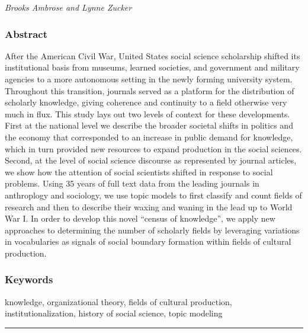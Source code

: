 \documentclass[]{book}
\theoremstyle{definition}
\theoremstyle{definition}
\theoremstyle{definition}
\theoremstyle{remark}
\begin{document}
\emph{Brooks Ambrose and Lynne Zucker}

\hypertarget{abstract-3}{%
\subsubsection*{Abstract}\label{abstract-3}}


After the American Civil War, United States social science
scholarship shifted its institutional basis from museums, learned
societies, and government and military agencies to a more autonomous
setting in the newly forming university system. Throughout this
transition, journals served as a platform for the distribution of
scholarly knowledge, giving coherence and continuity to a field
otherwise very much in flux. This study lays out two levels of context
for these developments. First at the national level we describe the
broader societal shifts in politics and the economy that corresponded to
an increase in public demand for knowledge, which in turn provided new
resources to expand production in the social sciences. Second, at the
level of social science discourse as represented by journal articles, we
show how the attention of social scientists shifted in response to
social problems. Using 35 years of full text data from the leading
journals in anthroplogy and sociology, we use topic models to first
classify and count fields of research and then to describe their waxing
and waning in the lead up to World War I. In order to develop this novel
``census of knowledge'', we apply new approaches to determining the
number of scholarly fields by leveraging variations in vocabularies as
signals of social boundary formation within fields of cultural
production.

\hypertarget{keywords-3}{%
\subsubsection*{Keywords}\label{keywords-3}}


knowledge, organizational theory, fields of cultural
production, institutionalization, history of social science, topic
modeling

\begin{center}\rule{0.5\linewidth}{\linethickness}\end{center}
\end{document}
